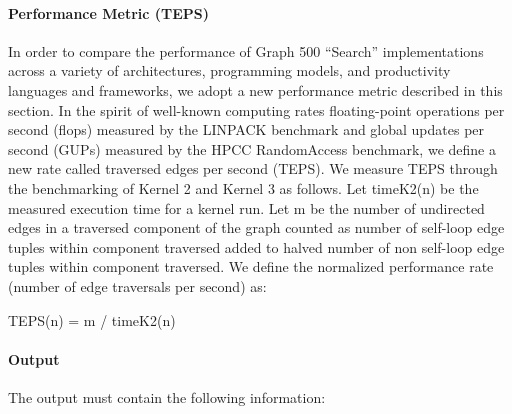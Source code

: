 \documentclass{article}
\begin{document}
\paragraph*{Performance Metric (TEPS)}

In order to compare the performance of Graph 500 ``Search'' implementations across a variety of architectures, programming models, and productivity languages and frameworks, we adopt a new performance metric described in this section. In the spirit of well-known computing rates floating-point operations per second (flops) measured by the LINPACK benchmark and global updates per second (GUPs) measured by the HPCC RandomAccess benchmark, we define a new rate called traversed edges per second (TEPS). We measure TEPS through the benchmarking of Kernel 2 and Kernel 3 as follows. Let timeK2(n) be the measured execution time for a kernel run. Let m be the number of undirected edges in a traversed component of the graph counted as number of self-loop edge tuples within component traversed added to halved number of non self-loop edge tuples within component traversed. We define the normalized performance rate (number of edge traversals per second) as:

TEPS(n) = m / timeK2(n)

\paragraph*{Output}

The output must contain the following information:
\end{document}
